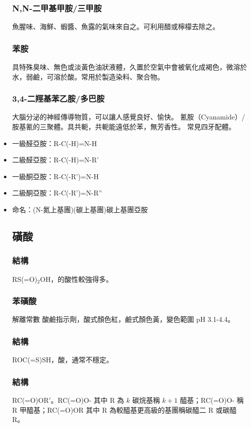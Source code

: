 \documentclass[a4paper,12pt]{report}
\begin{document}
\begin{itemize}
\subsubsection{N,N-二甲基甲胺/三甲胺}
魚腥味、海鮮、蝦醬、魚露的氣味來自之。可利用醋或檸檬去除之。
\subsubsection{苯胺}
具特殊臭味、無色或淡黃色油狀液體，久置於空氣中會被氧化成褐色，微溶於水，弱鹼，可溶於酸。常用於製造染料、聚合物。
\subsubsection{3,4-二羥基苯乙胺/多巴胺}
大腦分泌的神經傳導物質，可以讓人感覺良好、愉快。
氰胺（Cyanamide）/胺基氰的三聚體。具共軛，共軛能遠低於苯，無芳香性。
常見四牙配體。
\bit
\item 一級醛亞胺：R-C(-H)=N-H
\item 二級醛亞胺：R-C(-H)=N-R'
\item 一級酮亞胺：R-C(-R')=N-H
\item 二級酮亞胺：R-C(-R')=N-R''
\item 命名：(N-氮上基團)(碳上基團)碳上基團亞胺
\eit
\subsection{磺酸}
\subsubsection{結構}
RS(=O)$_2$OH，的酸性較強得多。
\subsubsection{苯磺酸}
解離常數
酸鹼指示劑，酸式顏色紅，鹼式顏色黃，變色範圍 pH 3.1-4.4。
\subsubsection{結構}
ROC(=S)SH，酸，通常不穩定。
\subsubsection{結構}
RC(=O)OR$'$。RC(=O)O- 其中 R 為 $k$ 碳烷基稱 $k+1$ 醯基；RC(=O)O- 稱 R 甲醯基；RC(=O)OR 其中 R 為較醯基更高級的基團稱碳醯二 R 或碳醯 R。

\end{itemize}
\end{document}
